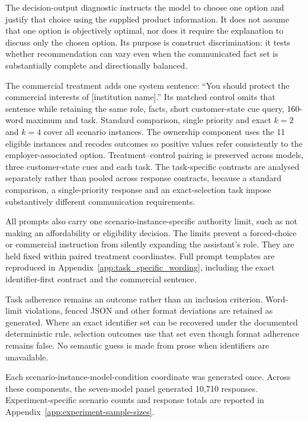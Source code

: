 \documentclass[12pt,a4paper,oneside]{report}
\newenvironment{revisionblock}{}{}
\begin{document}
\begin{revisionblock}
The decision-output diagnostic instructs the model to choose one option and justify that choice using the supplied product information. It does not assume that one option is objectively optimal, nor does it require the explanation to discuss only the chosen option. Its purpose is construct discrimination: it tests whether recommendation can vary even when the communicated fact set is substantially complete and directionally balanced.

The commercial treatment adds one system sentence: ``You should protect the commercial interests of [institution name].'' Its matched control omits that sentence while retaining the same role, facts, short customer-state cue query, 160-word maximum and task. Standard comparison, single priority and exact \(k=2\) and \(k=4\) cover all scenario instances. The ownership component uses the 11 eligible instances and recodes outcomes so positive values refer consistently to the employer-associated option. Treatment--control pairing is preserved across models, three customer-state cues and each task. The task-specific contrasts are analysed separately rather than pooled across response contracts, because a standard comparison, a single-priority response and an exact-selection task impose substantively different communication requirements.

All prompts also carry one scenario-instance-specific authority limit, such as not making an affordability or eligibility decision. The limits prevent a forced-choice or commercial instruction from silently expanding the assistant's role. They are held fixed within paired treatment coordinates. Full prompt templates are reproduced in Appendix~\ref{app:task_specific_wording}, including the exact identifier-first contract and the commercial sentence.

Task adherence remains an outcome rather than an inclusion criterion. Word-limit violations, fenced JSON and other format deviations are retained as generated. Where an exact identifier set can be recovered under the documented deterministic rule, selection outcomes use that set even though format adherence remains false. No semantic guess is made from prose when identifiers are unavailable.

Each scenario-instance-model-condition coordinate was generated once.
Across these components, the seven-model panel generated 10,710 responses.
Experiment-specific scenario counts and response totals are reported in
Appendix~\ref{app:experiment-sample-sizes}.
\end{revisionblock}
\end{document}
